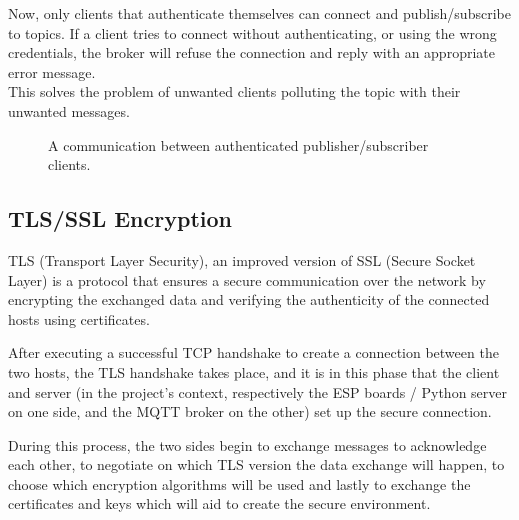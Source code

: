 \documentclass[target=bach,aauheader=,style=]{thud}
\begin{document}
Now, only clients that authenticate themselves can connect and publish/subscribe to topics. If a client tries to connect without authenticating, or using the wrong credentials, the broker will refuse the connection and reply with an appropriate error message. \\
This solves the problem of unwanted clients polluting the topic with their unwanted messages.
\begin{figure}[h!]
	\centering
	\caption{A communication between authenticated publisher/subscriber clients.}
	\label{fig:authpubsub}
\end{figure}
\newpage
\subsection{TLS/SSL Encryption}
TLS (Transport Layer Security), an improved version of SSL (Secure Socket Layer) is a protocol that ensures a secure communication over the network by encrypting the exchanged data and verifying the authenticity of the connected hosts using certificates.\par
\thinspace

After executing a successful TCP handshake to create a connection between the two hosts, the TLS handshake takes place, and it is in this phase that the client and server (in the project's context, respectively the ESP boards / Python server on one side, and the MQTT broker on the other) set up the secure connection.

During this process, the two sides begin to exchange messages to acknowledge each other, to negotiate on which TLS version the data exchange will happen, to choose which encryption algorithms will be used and lastly to exchange the certificates and keys which will aid to create the secure environment. 
\end{document}
